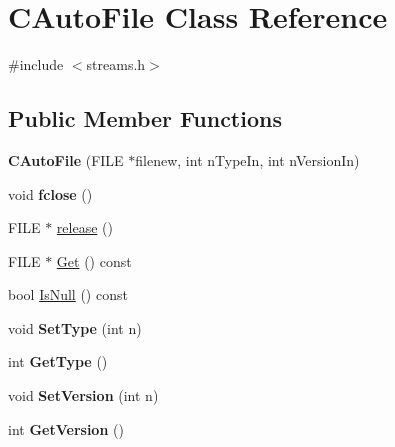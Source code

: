 \hypertarget{class_c_auto_file}{}\section{C\+Auto\+File Class Reference}
\label{class_c_auto_file}


{\ttfamily \#include $<$streams.\+h$>$}

\subsection*{Public Member Functions}
\begin{DoxyCompactItemize}
\item 
\mbox{\label{class_c_auto_file_a52613083aaeab4c9238c649ae471783f}} 
{\bfseries C\+Auto\+File} (F\+I\+LE $\ast$filenew, int n\+Type\+In, int n\+Version\+In)
\item 
\mbox{\label{class_c_auto_file_abcbafe943bfe392c09363078fa8a4e77}} 
void {\bfseries fclose} ()
\item 
F\+I\+LE $\ast$ \mbox{\hyperlink{class_c_auto_file_a25b51d94dc85c4140da0b15494ac9f8a}{release}} ()
\item 
F\+I\+LE $\ast$ \mbox{\hyperlink{class_c_auto_file_a2c1ad2d25562fea82a54bdef2793a0dd}{Get}} () const
\item 
bool \mbox{\hyperlink{class_c_auto_file_a7fd47268b6d85a89acafdb73559f8e78}{Is\+Null}} () const
\item 
\mbox{\label{class_c_auto_file_ac1a3986f191fe81384f58fc5fa073820}} 
void {\bfseries Set\+Type} (int n)
\item 
\mbox{\label{class_c_auto_file_a774f2aad2c462d4ff47125ceec2ebab0}} 
int {\bfseries Get\+Type} ()
\item 
\mbox{\label{class_c_auto_file_a51f805bc470a95c9948250503b587aec}} 
void {\bfseries Set\+Version} (int n)
\item 
\mbox{\label{class_c_auto_file_a976ab8e5477aedd3a531fc49b01153ce}} 
int {\bfseries Get\+Version} ()
\item 
\mbox{\label{class_c_auto_file_a9511060b5c971cff532faeab60c7d88b}} 

\end{DoxyCompactItemize}

